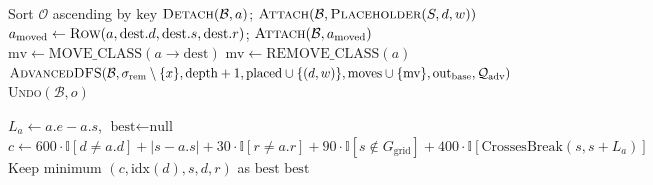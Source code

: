 \documentclass[11pt,a4paper]{article}
\begin{document}
\begin{algorithm}[htbp]
\begin{algorithmic}[1]
    \vspace{0.3em}
    \State Sort $\mathcal{O}$ ascending by $\text{key}$
        \State $\textsc{Detach}(\mathcal{B}, a)$; \quad $\textsc{Attach}(\mathcal{B}, \textsc{Placeholder}(S, d, w))$
            \State $a_{\text{moved}} \gets \textsc{Row}(a, \text{dest}.d, \text{dest}.s, \text{dest}.r)$; \quad $\textsc{Attach}(\mathcal{B}, a_{\text{moved}})$
            \State $\text{mv} \gets \text{MOVE\_CLASS}(a \to \text{dest})$
        \Else
            \State $\text{mv} \gets \text{REMOVE\_CLASS}(a)$
        \EndIf
        \State $\textsc{AdvancedDFS}(\mathcal{B}, \sigma_{\text{rem}} \setminus \{x\}, \text{depth}+1, \text{placed} \cup \{(d,w)\}, \text{moves} \cup \{\text{mv}\}, \text{out}_{\text{base}}, \mathcal{Q}_{\text{adv}})$
        \State \textsc{Undo}$(\mathcal{B}, o)$ 
    \EndFor
\EndProcedure

\vspace{0.5em}
    \State $L_a \gets a.e - a.s$, \quad $\text{best} \gets \text{null}$
                \State $c \gets 600\cdot\mathbb{I}[d \neq a.d] + |s - a.s| + 30\cdot\mathbb{I}[r \neq a.r] + 90\cdot\mathbb{I}[s \notin G_{\text{grid}}] + 400\cdot\mathbb{I}[\text{CrossesBreak}(s, s+L_a)]$
                \State Keep minimum $(c, \text{idx}(d), s, d, r)$ as $\text{best}$
            \EndIf
        \EndFor
    \EndFor
    \State \Return $\text{best}$
\EndFunction
\end{algorithmic}
\end{algorithm}
\end{document}
